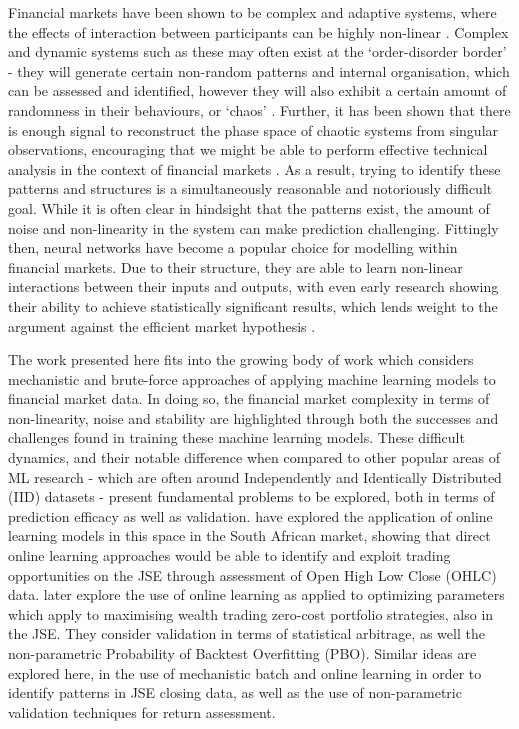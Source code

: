 \documentclass[a4paper,11pt,oneside]{article}
\theoremstyle{plain}
\theoremstyle{definition}
\begin{document}
	Financial markets have been shown to be complex and adaptive systems, where the effects of interaction 
	between participants can be highly non-linear \citep{Arthur}. Complex and dynamic systems such as these may 
	often exist at the `order-disorder border' - they will generate certain non-random patterns and internal organisation, 
	which can be assessed and identified, however they will also exhibit a certain amount of randomness in their behaviours, 
	or `chaos' \citep{Crutchfield}. Further, it has been shown that there is enough signal to reconstruct 
	the phase space of chaotic systems from singular observations, encouraging that we might be able to perform 
	effective technical analysis in the context of financial markets \citep{Packard, Takens}. As a result, trying to identify these patterns and structures is a simultaneously 
	reasonable and notoriously difficult goal. While it is often clear in hindsight that the patterns exist, the amount of 
	noise and non-linearity in the system can make prediction challenging.
	Fittingly then, neural networks have become a popular choice for modelling within financial markets. Due to 
	their structure, they are able to learn non-linear interactions between their inputs and outputs, with even early research 
	showing their ability to achieve statistically significant results, which lends weight to the 
	argument against the efficient market hypothesis \citep{Skabar}. 
	\hfill \break
	
	The work presented here fits into the growing body of work which considers mechanistic and brute-force approaches of applying 
	machine learning models to financial market data. In doing so, the financial market complexity in terms of non-linearity, noise and stability are highlighted through 
	both the successes and challenges found in training these machine learning models. These difficult dynamics, and their notable difference when 
	compared to other popular areas of ML research - which are often around Independently and Identically Distributed (IID) datasets - present fundamental problems to be explored, both 
	in terms of prediction efficacy as well as validation. \citet{Loonat} have explored the application of online learning models in this space
	 in the South African market, showing that direct online learning approaches would be able to identify and exploit trading opportunities on the JSE through assessment 
	 of Open High Low Close (OHLC) data. \citet{MurphyGebbie} later explore the use of online learning as applied to optimizing parameters which apply to maximising wealth trading zero-cost portfolio strategies, also in the JSE. They consider validation in terms of statistical arbitrage, as well the non-parametric Probability of Backtest Overfitting (PBO). Similar ideas are explored here, in the use of mechanistic batch and online learning in order to identify patterns in JSE closing data, as well as the use of non-parametric validation techniques for return assessment.
	
\end{document}
